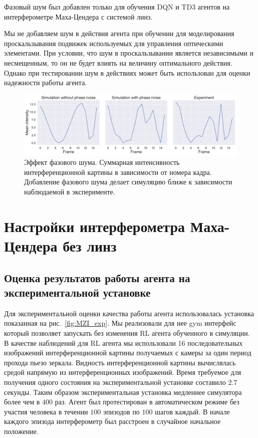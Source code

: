 Фазовый шум был добавлен только для обучения DQN и TD3 агентов на интерферометре Маха-Цендера с системой линз.

Мы не добавляем шум в действия агента при обучении для моделирования проскальзывания подвижек используемых для управления оптическими элементами. При условии, что шум в проскальзывании является независимыми и несмещенным, то он не будет влиять на величину оптимального действия. 
Однако при тестировании шум в действиях может быть использован для оценки надежности работы агента.


\begin{figure}
  \includegraphics[width=1\linewidth]{images/Piezo_noise.pdf}
  \centering
  \caption{Эффект фазового шума. Суммарная интенсивность интерференционной картины в зависимости от номера кадра. Добавление фазового шума делает симуляцию ближе к зависимости наблюдаемой в эксперименте.}
  \label{fig:piezo_noise}
\end{figure}


\section{Настройки интерферометра Маха-Цендера без линз}

\subsection{Оценка результатов работы агента на экспериментальной установке}
Для экспериментальной оценки качества работы агента использовалась установка показанная на рис.~\ref{fig:MZI_exp}. Мы реализовали для нее gym интерфейс \cite{brockman2016openai} который позволяет запускать без изменения RL агента обученного в симуляции. В качестве наблюдений для RL агента мы использовали 16 последовательных изображений интерференционной картины получаемых с камеры за один период прохода пьезо зеркала. Видность интерференционной картины вычислялась средой напрямую из интерференционных изображений. Время требуемое для получения одного состояния на экспериментальной установке составило $2.7$ секунды. Таким образом экспериментальная установка медленнее симулятора более чем в $400$ раз. Агент был протестирован в автоматическом режиме без участия человека в течении $100$ эпизодов по $100$ шагов каждый. В начале каждого эпизода интерферометр был расстроен в случайное начальное положение. 

